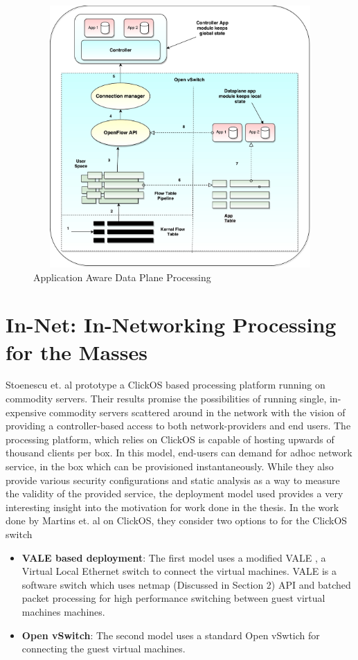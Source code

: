  \begin{figure}[H]
	\centering
	\caption{Application Aware Data Plane Processing}	
	\includegraphics[height=10cm,width=13cm]{appaware01.pdf}	
\end{figure}


\section{In-Net: In-Networking Processing for the Masses}
Stoenescu et. al \cite{NpForMasses} prototype a ClickOS based \cite{martins2014clickos} processing platform running on commodity servers. Their results promise the possibilities of running single, in-expensive commodity servers scattered around in the network with the vision of providing a controller-based access to both network-providers and end users. The processing platform, which relies on ClickOS is capable of hosting upwards of thousand clients per box. In this model, end-users can demand for adhoc network service, in the box which can be provisioned instantaneously. While they also provide various security configurations and static analysis as a way to measure the validity of the provided service, the deployment model used provides a very interesting insight into the motivation for work done in the thesis. 
In the work done by Martins et. al on ClickOS, they consider two options to for the ClickOS switch

\begin{itemize}
	\item \textbf{VALE based deployment}: The first model uses a modified VALE \cite{Rizzo:2012:VSE:2413176.2413185}, a Virtual Local Ethernet switch to connect the virtual machines. VALE is a software switch which uses netmap (Discussed in Section 2) API and batched packet processing for high performance switching between guest virtual machines machines.
	\item \textbf{Open vSwitch}: The second model uses a standard Open vSwtich for connecting the guest virtual machines.
\end{itemize}

